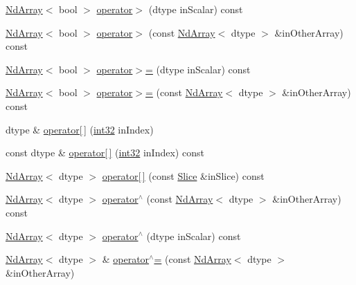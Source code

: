 \begin{DoxyCompactItemize}
\item 
\mbox{\hyperlink{class_num_c_1_1_nd_array}{Nd\+Array}}$<$ bool $>$ \mbox{\hyperlink{class_num_c_1_1_nd_array_aa00a43e8341f4322f182619f83e7a64c}{operator$>$}} (dtype in\+Scalar) const
\item 
\mbox{\hyperlink{class_num_c_1_1_nd_array}{Nd\+Array}}$<$ bool $>$ \mbox{\hyperlink{class_num_c_1_1_nd_array_a9689867e06e8eaadd14e5894aa9c0314}{operator$>$}} (const \mbox{\hyperlink{class_num_c_1_1_nd_array}{Nd\+Array}}$<$ dtype $>$ \&in\+Other\+Array) const
\item 
\mbox{\hyperlink{class_num_c_1_1_nd_array}{Nd\+Array}}$<$ bool $>$ \mbox{\hyperlink{class_num_c_1_1_nd_array_a0d67e0665db97abe686599cb0a9d0196}{operator$>$=}} (dtype in\+Scalar) const
\item 
\mbox{\hyperlink{class_num_c_1_1_nd_array}{Nd\+Array}}$<$ bool $>$ \mbox{\hyperlink{class_num_c_1_1_nd_array_a954c60e9d86bf650cc4a58953fce1e59}{operator$>$=}} (const \mbox{\hyperlink{class_num_c_1_1_nd_array}{Nd\+Array}}$<$ dtype $>$ \&in\+Other\+Array) const
\item 
dtype \& \mbox{\hyperlink{class_num_c_1_1_nd_array_a2691e9a00d2312da23cb97bb22fcddc9}{operator\mbox{[}$\,$\mbox{]}}} (\mbox{\hyperlink{namespace_num_c_aa5a7e69266097d55816d4cdb19542b53}{int32}} in\+Index)
\item 
const dtype \& \mbox{\hyperlink{class_num_c_1_1_nd_array_a1304c70c1a2360b370792a6be37e94cd}{operator\mbox{[}$\,$\mbox{]}}} (\mbox{\hyperlink{namespace_num_c_aa5a7e69266097d55816d4cdb19542b53}{int32}} in\+Index) const
\item 
\mbox{\hyperlink{class_num_c_1_1_nd_array}{Nd\+Array}}$<$ dtype $>$ \mbox{\hyperlink{class_num_c_1_1_nd_array_ae59cd422917912b1f58e66af33f7a5e2}{operator\mbox{[}$\,$\mbox{]}}} (const \mbox{\hyperlink{class_num_c_1_1_slice}{Slice}} \&in\+Slice) const
\item 
\mbox{\hyperlink{class_num_c_1_1_nd_array}{Nd\+Array}}$<$ dtype $>$ \mbox{\hyperlink{class_num_c_1_1_nd_array_a86e0b03b3047d52c129587a755836bb5}{operator$^\wedge$}} (const \mbox{\hyperlink{class_num_c_1_1_nd_array}{Nd\+Array}}$<$ dtype $>$ \&in\+Other\+Array) const
\item 
\mbox{\hyperlink{class_num_c_1_1_nd_array}{Nd\+Array}}$<$ dtype $>$ \mbox{\hyperlink{class_num_c_1_1_nd_array_a46351f19fb411acd32a90e105e7a0670}{operator$^\wedge$}} (dtype in\+Scalar) const
\item 
\mbox{\hyperlink{class_num_c_1_1_nd_array}{Nd\+Array}}$<$ dtype $>$ \& \mbox{\hyperlink{class_num_c_1_1_nd_array_aef02ef824dbc1fc46eea2273eb7ec063}{operator$^\wedge$=}} (const \mbox{\hyperlink{class_num_c_1_1_nd_array}{Nd\+Array}}$<$ dtype $>$ \&in\+Other\+Array)

\end{DoxyCompactItemize}
